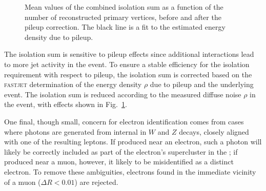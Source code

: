 \begin{figure}[!htbp]
  \centering
  \hfill
  \caption[Mean values of the combined isolation sum as a function of the number of reconstructed primary vertices, before and after the pileup correction]{Mean values of the combined isolation sum as a function of the number of reconstructed primary vertices, before and after the pileup correction.  The black line is a fit to the estimated energy density due to pileup.}
  \label{fig:fastjet-correction}
\end{figure}

The isolation sum is sensitive to pileup effects since additional interactions lead to more jet activity in the event.  To ensure a stable efficiency for the isolation requirement with respect to pileup, the isolation sum is corrected based on the \textsc{fastjet} determination of the energy density $\rho$ due to pileup and the underlying event.  The isolation sum is reduced according to the measured diffuse noise $\rho$ in the event, with effects shown in Fig.~\ref{fig:fastjet-correction}.

One final, though small, concern for electron identification comes from cases where photons are generated from internal \brem{} in $W$ and $Z$ decays, closely aligned with one of the resulting leptons.  If produced near an electron, such a photon will likely be correctly included as part of the electron's supercluster in the \ecal; if produced near a muon, however, it likely to be misidentified as a distinct electron.  To remove these ambiguities, electrons found in the immediate vicinity of a muon ($\Delta R < 0.01$) are rejected.

